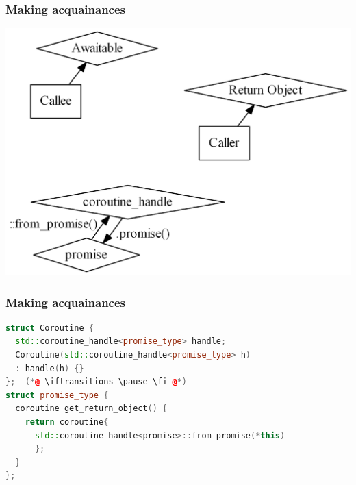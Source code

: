\documentclass[aspectratio=169]{beamer}
\newif\iftransitions
\begin{document}
\begin{frame}[fragile]
  \frametitle{Making acquainances}
  
  \begin{center}
  \includegraphics[height=.9\textheight]{pipelinesgfx/acquaintances01.png}
  \end{center}
\end{frame}

\begin{frame}[fragile]
  \frametitle{Making acquainances}

  \begin{lstlisting}[language={C++}]
struct Coroutine {
  std::coroutine_handle<promise_type> handle;
  Coroutine(std::coroutine_handle<promise_type> h)
  : handle(h) {}
};  (*@ \iftransitions \pause \fi @*)
struct promise_type {
  coroutine get_return_object() {
    return coroutine{
      std::coroutine_handle<promise>::from_promise(*this)
      };
  }
};
  \end{lstlisting}
\end{frame}
\end{document}
